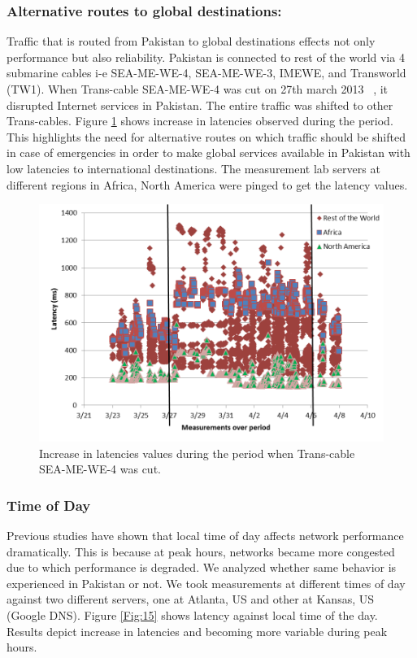 \documentclass{sig-alternate-10pt}
\begin{document}
\begin{sloppypar}
\subsubsection{Alternative routes to global destinations:}
Traffic that is routed from Pakistan to global destinations effects not only performance but also reliability. Pakistan is connected to rest of the world via 4 submarine cables i-e SEA-ME-WE-4, SEA-ME-WE-3, IMEWE, and Transworld (TW1). When Trans-cable SEA-ME-WE-4 was cut on 27th march 2013 ~\cite{27}, it disrupted Internet services in Pakistan. The entire traffic was shifted to other Trans-cables. Figure \ref{Fig:14} shows increase in latencies observed during the period. This highlights the need for alternative routes on which traffic should be shifted in case of emergencies in order to make global services available in Pakistan with low latencies to international destinations. The measurement lab servers at different regions in Africa, North America were pinged to get the latency values.
\begin{figure}[t!]
\begin {center}
   \includegraphics[height=0.2 \textheight,width=0.48 \textwidth]{13.png}
   \end {center}
 \caption{Increase in latencies values during the period when Trans-cable SEA-ME-WE-4 was cut.}\label{Fig:14}
\end{figure}
\subsubsection{Time of Day}
Previous studies have shown that local time of day affects network performance dramatically. This is because at peak hours, networks became more congested ~\cite{23} due to which performance is degraded. We analyzed whether same behavior is experienced in Pakistan or not.
We took measurements at different times of day against two different servers, one at Atlanta, US and other at Kansas, US (Google DNS). Figure \ref{Fig:15} shows latency against local time of the day.  Results depict increase in latencies and becoming more variable during peak hours.


\end{sloppypar}
\end{document}
